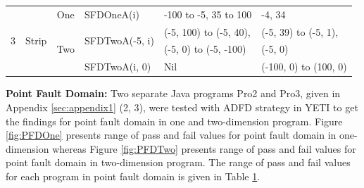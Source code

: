 \begin{table}[h]
{\begin{tabular}{|c|c|c|l|l|l|}
				



\multirow{5}{*}{3} 	&	\multirow{5}{*}{Strip}					& 	\multirow{2}{*}{One}			&	\multirow{2}{*}{SFDOneA(i)}	&	\multirow{2}{*}{-100 to -5, 35 to 100}		& 	\multirow{2}{*}{-4, 34	}\\ 
				&									&							&							&									&				\\  \cline{3-6}
				&									&	\multirow{3}{*}{Two}			&	\multirow{2}{*}{SFDTwoA(-5, i)}	&	(-5, 100) to (-5, 40),					&  (-5, 39) to (-5, 1), 			\\ 
				&									&							&							&	 (-5, 0) to (-5, -100)					&	(-5, 0)				\\ \cline{4-6}
				&									& 							&	SFDTwoA(i, 0)				&	Nil								&  (-100, 0) to (100, 0)			\\  \hline
				
				
\end{tabular}
}
\label{table:failtable}
\end{table}

\bigskip

\textbf{Point Fault Domain:}  Two separate Java programs Pro2 and Pro3, given in Appendix \ref{sec:appendix1} (2, 3), were tested with ADFD strategy in YETI to get the findings for point fault domain in one and two-dimension program. Figure \ref{fig:PFDOne} presents range of pass and fail values for point fault domain in one-dimension whereas Figure \ref{fig:PFDTwo} presents range of pass and fail values for point fault domain in two-dimension program. The range of pass and fail values for each program in point fault domain is given in Table \ref{table:failtable}.

